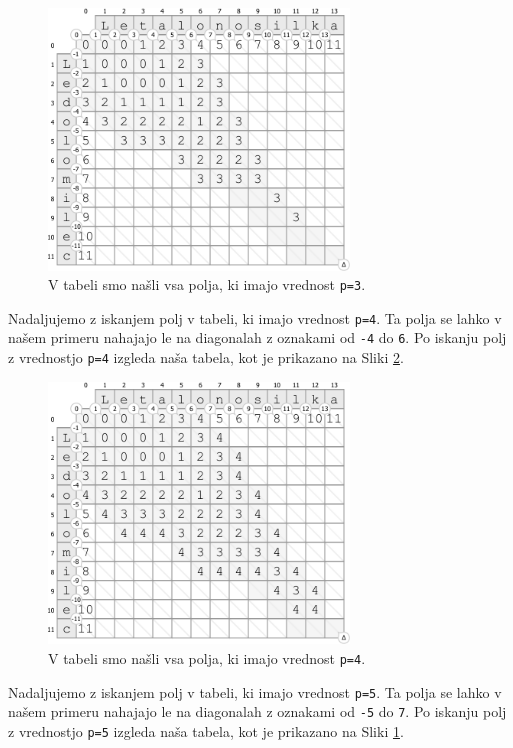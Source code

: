 \documentclass[a4paper, 12pt, twoside]{book}
\begin{document}
\begin{figure}[placement h]
\begin{center}
\includegraphics[width=8cm]{img/ses6.pdf}
\end{center}
\caption{V tabeli smo našli vsa polja, ki imajo vrednost {\tt p=3}.}
\label{ses6}
\end{figure}

Nadaljujemo z iskanjem polj v tabeli, ki imajo vrednost {\tt p=4}. Ta polja se lahko v našem primeru nahajajo le na diagonalah z oznakami od {\tt -4} do {\tt 6}. Po iskanju polj z vrednostjo {\tt p=4} izgleda naša tabela, kot je prikazano na Sliki \ref{ses7}.

\begin{figure}[placement h]
\begin{center}
\includegraphics[width=8cm]{img/ses7.pdf}
\end{center}
\caption{V tabeli smo našli vsa polja, ki imajo vrednost {\tt p=4}.}
\label{ses7}
\end{figure}

\pagebreak

Nadaljujemo z iskanjem polj v tabeli, ki imajo vrednost {\tt p=5}. Ta polja se lahko v našem primeru nahajajo le na diagonalah z oznakami od {\tt -5} do {\tt 7}. Po iskanju polj z vrednostjo {\tt p=5} izgleda naša tabela, kot je prikazano na Sliki \ref{ses6}.
\end{document}
